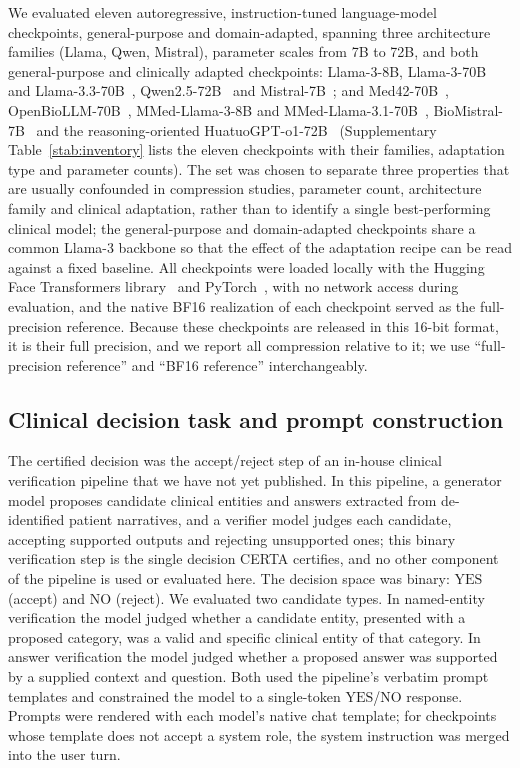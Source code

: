 \documentclass[pdflatex,sn-mathphys-num]{sn-jnl}%
\newcommand{\YES}{\mathrm{YES}}
\newcommand{\NO}{\mathrm{NO}}
\theoremstyle{thmstyleone}%
\theoremstyle{thmstyletwo}%
\theoremstyle{thmstylethree}%
\begin{document}
We evaluated eleven autoregressive, instruction-tuned language-model checkpoints, general-purpose and domain-adapted, spanning three architecture
families (Llama, Qwen, Mistral), parameter scales from 7B to 72B, and both general-purpose and
clinically adapted checkpoints: Llama-3-8B, Llama-3-70B and Llama-3.3-70B~\cite{grattafiori2024llama3}, Qwen2.5-72B~\cite{qwen2024qwen25} and
Mistral-7B~\cite{jiang2023mistral}; and Med42-70B~\cite{christophe2024med42v2}, OpenBioLLM-70B~\cite{pal2024openbiollm}, MMed-Llama-3-8B and MMed-Llama-3.1-70B~\cite{qiu2024mmedlm}, BioMistral-7B~\cite{labrak2024biomistral} and
the reasoning-oriented HuatuoGPT-o1-72B~\cite{chen2024huatuogpto1} (Supplementary Table~\ref{stab:inventory} lists the eleven checkpoints with their families, adaptation type and parameter counts). The set was chosen to separate three properties that are
usually confounded in compression studies, parameter count, architecture family and clinical
adaptation, rather than to identify a single best-performing clinical model; the general-purpose and domain-adapted
checkpoints share a common Llama-3 backbone so that the effect of the adaptation recipe can be
read against a fixed baseline. All checkpoints were loaded locally with the Hugging Face Transformers library~\cite{wolf2020transformers} and PyTorch~\cite{paszke2019pytorch}, with no network access during
evaluation, and the native BF16 realization of each checkpoint served as the full-precision reference.
Because these checkpoints are released in this 16-bit format, it is their full precision, and we report
all compression relative to it; we use ``full-precision reference'' and ``BF16 reference'' interchangeably.
 
\subsection*{Clinical decision task and prompt construction}
 
The certified decision was the accept/reject step of an in-house clinical verification
pipeline that we have not yet published. In this pipeline, a generator model proposes candidate clinical
entities and answers extracted from de-identified patient narratives, and a verifier model judges
each candidate, accepting supported outputs and rejecting unsupported ones; this binary verification
step is the single decision CERTA certifies, and no other component of the pipeline is used or
evaluated here. The decision
space was binary: $\YES$ (accept) and $\NO$ (reject). We evaluated two candidate types. In
named-entity verification the model judged whether a candidate entity, presented with a proposed
category, was a valid and specific clinical entity of that category. In answer verification the
model judged whether a proposed answer was supported by a supplied context and question. Both used
the pipeline's verbatim prompt templates and constrained the model to a single-token $\YES$/$\NO$
response. Prompts were rendered with each model's native chat template; for checkpoints whose
template does not accept a system role, the system instruction was merged into the user turn.
 
\end{document}
